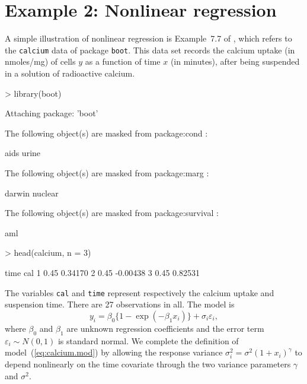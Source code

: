 \documentclass[a4paper,11pt]{article}
\def\code{\texttt}
\begin{document}
\section*{Example 2: Nonlinear regression}
%
A simple illustration of nonlinear regression is Example~7.7 of \citet{davison.hinkley:1997}, which refers to the \code{calcium} data of package \code{boot}.  This data set records the calcium uptake (in nmoles/mg) of cells $y$ as a function of time $x$ (in minutes), after being suspended in a solution of radioactive calcium.  
%
\begin{Schunk}
\begin{Sinput}
> library(boot)
\end{Sinput}
\begin{Soutput}
Attaching package: 'boot'


	The following object(s) are masked from package:cond :

	 aids urine 


	The following object(s) are masked from package:marg :

	 darwin nuclear 


	The following object(s) are masked from package:survival :

	 aml 
\end{Soutput}
\begin{Sinput}
> head(calcium, n = 3)
\end{Sinput}
\begin{Soutput}
  time      cal
1 0.45  0.34170
2 0.45 -0.00438
3 0.45  0.82531
\end{Soutput}
\end{Schunk}
%
The variables \code{cal} and \code{time} represent respectively the calcium uptake and suspension time.  There are 27 observations in all.  The model is 
%
\begin{equation}
\label{eq:calcium.mod}
y_i = \beta_0\{1-\exp(-\beta_1x_i)\} + \sigma_i\varepsilon_i,
\end{equation}
%
where $\beta_0$ and $\beta_1$ are unknown regression coefficients and the error term $\varepsilon_i \sim N(0,1)$ is standard normal.  We complete the definition of model~(\ref{eq:calcium.mod}) by allowing the response variance $\sigma^2_i = \sigma^2(1+x_i)^\gamma$ to depend nonlinearly on the time covariate through the two variance parameters $\gamma$ and $\sigma^2$.  
\end{document}
